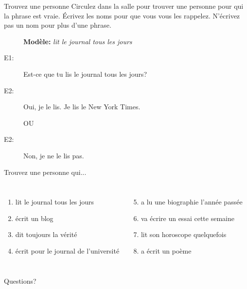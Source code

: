 \documentclass{beamer}
\begin{document}
  \begin{frame}{Trouvez une personne}
    \scriptsize
    Circulez dans la salle pour trouver une personne pour qui la phrase est vraie.
    Écrivez les noms pour que vous vous les rappelez.
    N'écrivez pas un nom pour plus d'une phrase.
    \begin{description}
      \item[] \textbf{Modèle:} \emph{lit le journal tous les jours}
      \item[E1:] Est-ce que tu lis le journal tous les jours?
      \item[E2:] Oui, je le lis. Je lis le New York Times.
      \item[] OU
      \item[E2:] Non, je ne le lis pas.
    \end{description}
    \vspace{12pt}
    Trouvez une personne qui...
    \begin{columns}[t]
        \begin{enumerate}
          \item lit le journal tous les jours
          \item écrit un blog
          \item dit toujours la vérité
          \item écrit pour le journal de l'université
        \end{enumerate}
        \begin{enumerate}
          \setcounter{enumi}{4}
          \item a lu une biographie l'année passée
          \item va écrire un essai cette semaine
          \item lit son horoscope quelquefois
          \item a écrit un poème
        \end{enumerate}
    \end{columns}
  \end{frame}

  \begin{frame}{}
    \begin{center}
      \Large Questions?
    \end{center}
  \end{frame}
\end{document}
